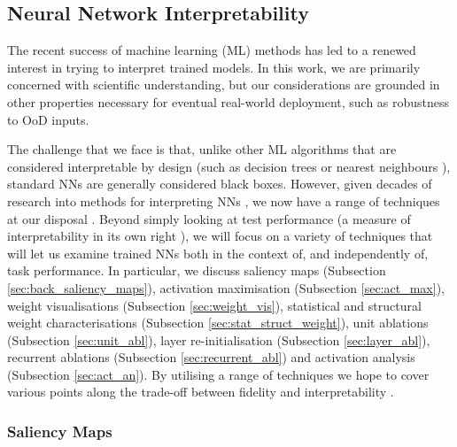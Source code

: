 \hypertarget{neural-network-interpretability}{%
\subsection{Neural Network
Interpretability}\label{neural-network-interpretability}}

\label{sec:nn_interpretability}

The recent success of machine learning (ML) methods has led to a renewed
interest in trying to interpret trained models. In this work, we are
primarily concerned with scientific understanding, but our
considerations are grounded in other properties necessary for eventual
real-world deployment, such as robustness to OoD inputs.

The challenge that we face is that, unlike other ML algorithms that are
considered interpretable by design (such as decision trees or nearest
neighbours \cite{freitas2014comprehensible}), standard NNs are
generally considered black boxes. However, given decades of research
into methods for interpreting NNs
\cite{craven1996extracting, morch1995visualization}, we now have a
range of techniques at our disposal \cite{guidotti2018survey}. Beyond
simply looking at test performance (a measure of interpretability in its
own right \cite{doshi2017towards}), we will focus on a variety of
techniques that will let us examine trained NNs both in the context of,
and independently of, task performance. In particular, we discuss
saliency maps (Subsection \ref{sec:back_saliency_maps}), activation
maximisation (Subsection \ref{sec:act_max}), weight visualisations
(Subsection \ref{sec:weight_vis}), statistical and structural weight
characterisations (Subsection \ref{sec:stat_struct_weight}), unit
ablations (Subsection \ref{sec:unit_abl}), layer re-initialisation
(Subsection \ref{sec:layer_abl}), recurrent ablations (Subsection
\ref{sec:recurrent_abl}) and activation analysis (Subsection
\ref{sec:act_an}). By utilising a range of techniques we hope to cover
various points along the trade-off between fidelity and interpretability
\cite{ribeiro2016should}.

\hypertarget{saliency-maps}{%
\subsubsection{Saliency Maps}\label{saliency-maps}}

\label{sec:back_saliency_maps}

